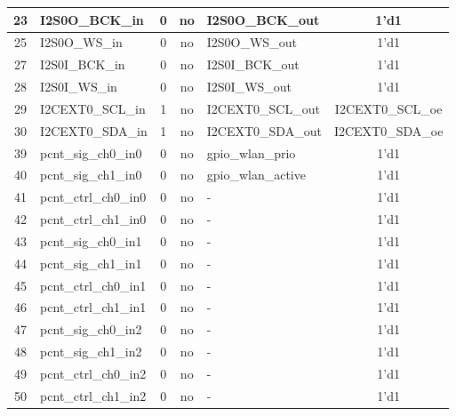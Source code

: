 \begin{longtable}[c]{|c|l|c|c|l|c|}
 23  &           I2S0O\_BCK\_in  &  0  &   no  &         I2S0O\_BCK\_out  &               1'd1  \\\hline
 25  &            I2S0O\_WS\_in  &  0  &   no  &          I2S0O\_WS\_out  &               1'd1  \\\hline
 27  &           I2S0I\_BCK\_in  &  0  &   no  &         I2S0I\_BCK\_out  &               1'd1  \\\hline
 28  &            I2S0I\_WS\_in  &  0  &   no  &          I2S0I\_WS\_out  &               1'd1  \\\hline
 29  &         I2CEXT0\_SCL\_in  &  1  &   no  &       I2CEXT0\_SCL\_out  &   I2CEXT0\_SCL\_oe  \\\hline
 30  &         I2CEXT0\_SDA\_in  &  1  &   no  &       I2CEXT0\_SDA\_out  &   I2CEXT0\_SDA\_oe  \\\hline
 39  &      pcnt\_sig\_ch0\_in0  &  0  &   no  &        gpio\_wlan\_prio  &               1'd1  \\\hline
 40  &      pcnt\_sig\_ch1\_in0  &  0  &   no  &      gpio\_wlan\_active  &               1'd1  \\\hline
 41  &     pcnt\_ctrl\_ch0\_in0  &  0  &   no  &                       -  &               1'd1  \\\hline
 42  &     pcnt\_ctrl\_ch1\_in0  &  0  &   no  &                       -  &               1'd1  \\\hline
 43  &      pcnt\_sig\_ch0\_in1  &  0  &   no  &                       -  &               1'd1  \\\hline
 44  &      pcnt\_sig\_ch1\_in1  &  0  &   no  &                       -  &               1'd1  \\\hline
 45  &     pcnt\_ctrl\_ch0\_in1  &  0  &   no  &                       -  &               1'd1  \\\hline
 46  &     pcnt\_ctrl\_ch1\_in1  &  0  &   no  &                       -  &               1'd1  \\\hline
 47  &      pcnt\_sig\_ch0\_in2  &  0  &   no  &                       -  &               1'd1  \\\hline
 48  &      pcnt\_sig\_ch1\_in2  &  0  &   no  &                       -  &               1'd1  \\\hline
 49  &     pcnt\_ctrl\_ch0\_in2  &  0  &   no  &                       -  &               1'd1  \\\hline
 50  &     pcnt\_ctrl\_ch1\_in2  &  0  &   no  &                       -  &               1'd1  \\\hline

\end{longtable}
